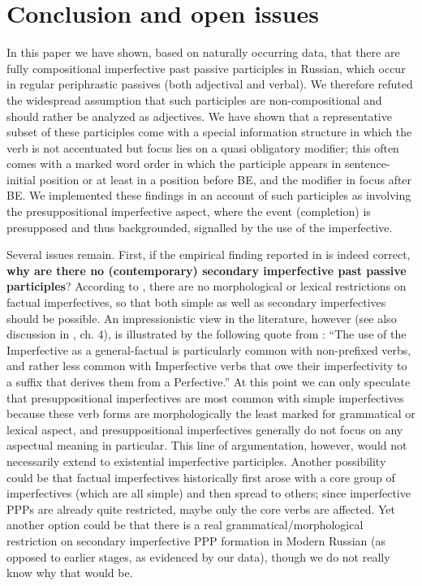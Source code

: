 \documentclass[output=paper,
modfonts,
newtxmath,
hidelinks
]{langscibook}
\begin{document}
\section{Conclusion and open issues}
\label{concl}

In this paper we have shown, based on naturally occurring data, that there are fully compositional imperfective past passive participles in Russian, which occur in regular periphrastic passives (both adjectival and verbal). We therefore refuted the widespread assumption that such participles are non-compositional and should rather be analyzed as adjectives. We have shown that a representative subset of these participles come with a special information structure in which the verb is not accentuated but focus lies on a quasi obligatory modifier; this often comes with a marked word order in which the participle appears in sentence-initial position or at least in a position before BE, and the modifier in focus after BE. We implemented these findings in an account of such participles as involving the presuppositional imperfective aspect, where the event (completion) is presupposed and thus backgrounded, signalled by the use of the imperfective.

Several issues remain. First, if the empirical finding reported in  is indeed correct, \textbf{why are there no (contemporary) secondary imperfective past passive participles}? According to \citet{gronndiss}, there are no morphological or lexical restrictions on factual imperfectives, so that both simple as well as secondary imperfectives should be possible. An impressionistic view in the literature, however (see also discussion in \citealt{gronndiss}, ch. 4), is illustrated by the following quote from \citet[][118]{comrie76}: ``The use of the Imperfective as a general-factual is particularly common with non-prefixed verbs, and rather less common with Imperfective verbs that owe their imperfectivity to a suffix that derives them from a Perfective.'' At this point we can only speculate that presuppositional imperfectives are most common with simple imperfectives because these verb forms are morphologically the least marked for grammatical or lexical aspect, and presuppositional imperfectives  generally do not focus on any aspectual meaning in particular. This line of argumentation, however, would not necessarily extend to existential imperfective participles. Another possibility could be that factual imperfectives historically first arose with a core group of imperfectives (which are all simple) and then spread to others; since imperfective PPPs are already quite restricted, maybe only the core verbs are affected. Yet another option could be that there is a real grammatical/morphological restriction on secondary imperfective PPP formation in Modern Russian (as opposed to earlier stages, as evidenced by our data), though we do not really know why that would be.
\end{document}

